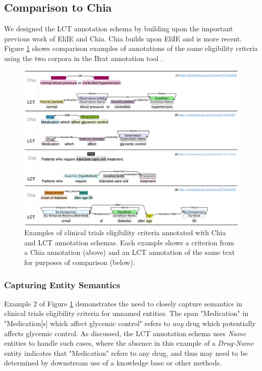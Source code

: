 \documentclass[../main.tex]{subfiles}
\begin{document}
\subsection{Comparison to Chia}

We designed the LCT annotation schema by building upon the important previous work of EliIE and Chia. Chia builds upon EliIE and is more recent. Figure \ref{fig_chia_vs_lct} shows comparison examples of annotations of the same eligibility criteria using the two corpora in the Brat annotation tool \cite{stenetorp2012brat}. \\

\begin{figure}[h!]
  \includegraphics[scale=0.52]{Figures/3_lct_corpus/chia_vs_lct.pdf}  
    \caption{Examples of clinical trials eligibility criteria annotated with Chia and LCT annotation schemas. Each example shows a criterion from a Chia annotation (above) and an LCT annotation of the same text for purposes of comparison (below).}
\label{fig_chia_vs_lct}
\end{figure}

\subsubsection{Capturing Entity Semantics}
\noindent Example 2 of Figure \ref{fig_chia_vs_lct} demonstrates the need to closely capture semantics in clinical trials eligibility criteria for unnamed entities. The span "Medication" in "Medication[s] which affect glycemic control" refers to \textit{any} drug which potentially affects glycemic control. As discussed, the LCT annotation schema uses \textit{Name} entities to handle such cases, where the absence in this example of a \textit{Drug-Name} entity indicates that "Medication" refers to any drug, and thus may need to be determined by downstream use of a knowledge base or other methods. 
\end{document}
